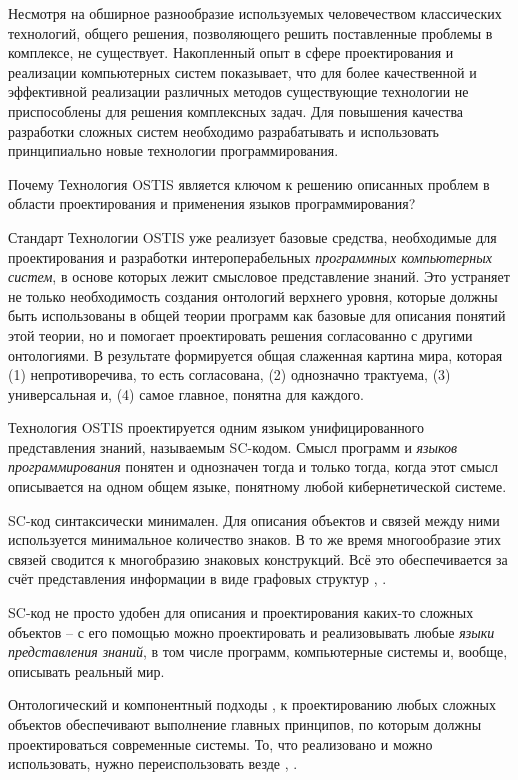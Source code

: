 Несмотря на обширное разнообразие используемых человечеством классических технологий, общего решения, позволяющего решить поставленные проблемы в комплексе, не существует. Накопленный опыт в сфере проектирования и реализации компьютерных систем показывает, что для более качественной и эффективной реализации различных методов существующие технологии не приспособлены для решения комплексных задач. Для повышения качества разработки сложных систем необходимо разрабатывать и использовать принципиально новые технологии программирования.

Почему Технология OSTIS является ключом к решению описанных проблем в области проектирования и применения языков программирования?
\begin{textitemize}
    \item {Стандарт Технологии OSTIS \cite{Standard2021} уже реализует базовые средства, необходимые для проектирования и разработки интероперабельных \textit{программных компьютерных систем}, в основе которых лежит смысловое представление знаний. Это устраняет не только необходимость создания онтологий верхнего уровня, которые должны быть использованы в общей теории программ как базовые для описания понятий этой теории, но и помогает проектировать решения согласованно с другими онтологиями. В результате формируется общая слаженная картина мира, которая (1) непротиворечива, то есть согласована, (2) однозначно трактуема, (3) универсальная и, (4) самое главное, понятна для каждого.}
    \item {Технология OSTIS проектируется одним языком унифицированного представления знаний, называемым SC-кодом. Смысл программ и \textit{языков программирования} понятен и однозначен тогда и только тогда, когда этот смысл описывается на одном общем языке, понятному любой кибернетической системе.}
    \item {SC-код синтаксически минимален. Для описания объектов и связей между ними используется минимальное количество знаков. В то же время многообразие этих связей сводится к многобразию знаковых конструкций. Всё это обеспечивается за счёт представления информации в виде графовых структур \cite{Kasyanov2003}, \cite{Petrov1978}.}
    \item {SC-код не просто удобен для описания и проектирования каких-то сложных объектов -- с его помощью можно проектировать и реализовывать любые \textit{языки представления знаний}, в том числе программ, компьютерные системы и, вообще, описывать реальный мир.}
    \item {Онтологический и компонентный подходы \cite{Sales2022}, \cite{Samaa2020} к проектированию любых сложных объектов обеспечивают выполнение главных принципов, по которым должны проектироваться современные системы. То, что реализовано и можно использовать, нужно переиспользовать везде \cite{O4IS2007}, \cite{Molorodov2019}.}
\end{textitemize}

